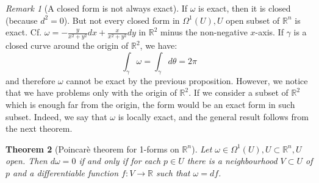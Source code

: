 \documentclass[a4paper,11pt,titlepage]{article}
\numberwithin{equation}{section}
\newtheorem{theorem}{Theorem}[section]
\theoremstyle{definition}
\theoremstyle{remark}
\newtheorem{remark}[theorem]{Remark}
\newcommand{\rfield}{\mathbb{R}}
\begin{document}
\begin{remark}[A closed form is not always exact]
  If $\omega$ is exact, then it is closed (because $d^2=0$). But not every closed form in $\Omega^1(U), U$ open subset of $\rfield^n$ is exact. Cf. $\omega = - \frac{y}{x^2 + y^2} dx + \frac{x}{x^2+y^2}dy$ in $\rfield^2$ minus the non-negative $x$-axis. If $\gamma$ is a closed curve around the origin of $\rfield^2$, we have:
  $$\int_{\gamma} \omega = \int_{\gamma} d\theta = 2\pi$$
  and therefore $\omega$ cannot be exact by the previous proposition. However, we notice that we have problems only with the origin of $\rfield^2$. If we consider a subset of $\rfield^2$ which is enough far from the origin, the form would be an exact form in such subset. Indeed, we say that $\omega$ is locally exact, and the general result follows from the next theorem.
\end{remark}

\begin{theorem}[Poincarè theorem for 1-forms on $\rfield^n$]
  Let $\omega \in \Omega^1(U), U \subset \rfield^n, U$ open. Then $d\omega = 0$ if and only if for each $p \in U$ there is a neighbourhood $V \subset U$ of $p$ and a differentiable function $f \colon V \rightarrow \rfield$ such that $\omega = df$.
\end{theorem}
\end{document}

